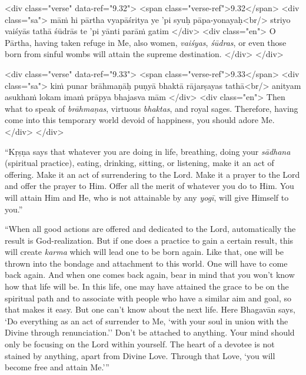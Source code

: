 \begin{html}
<div class="verse" data-ref="9.32">
  <span class="verse-ref">9.32</span>
  <div class="sa">
    māṁ hi pārtha vyapāśritya ye ’pi syuḥ pāpa-yonayaḥ<br/>
    striyo vaiśyās tathā śūdrās te ’pi yānti parāṁ gatim
  </div>
  <div class="en">
    O Pārtha, having taken refuge in Me, also women, \textit{vaiśyas}, \textit{śūdras}, or even those born from sinful wombs will attain the supreme destination.
  </div>
</div>
\end{html}



\begin{html}
<div class="verse" data-ref="9.33">
  <span class="verse-ref">9.33</span>
  <div class="sa">
    kiṁ punar brāhmaṇāḥ puṇyā bhaktā rājarṣayas tathā<br/>
    anityam asukhaṁ lokam imaṁ prāpya bhajasva mām
  </div>
  <div class="en">
    Then what to speak of \textit{brāhmaṇas}, virtuous \textit{bhaktas}, and royal sages. Therefore, having come into this temporary world devoid of happiness, you should adore Me.
  </div>
</div>
\end{html}


\enquote{Kṛṣṇa says that whatever you are doing in life, breathing, doing your \textit{sādhana} (spiritual practice), eating, drinking, sitting, or listening, make it an act of offering. Make it an act of surrendering to the Lord. Make it a prayer to the Lord and offer the prayer to Him. Offer all the merit of whatever you do to Him. You will attain Him and He, who is not attainable by any \textit{yogī}, will give Himself to you.}

\enquote{When all good actions are offered and dedicated to the Lord, automatically the result is God-realization. But if one does a practice to gain a certain result, this will create \textit{karma} which will lead one to be born again. Like that, one will be thrown into the bondage and attachment to this world. One will have to come back again. And when one comes back again, bear in mind that you won’t know how that life will be. In this life, one may have attained the grace to be on the spiritual path and to associate with people who have a similar aim and goal, so that makes it easy. But one can’t know about the next life. Here Bhagavān says, \enquote{Do everything as an act of surrender to Me, ‘with your soul in union with the Divine through renunciation.’} Don’t be attached to anything. Your mind should only be focusing on the Lord within yourself. The heart of a devotee is not stained by anything, apart from Divine Love. Through that Love, \enquote{you will become free and attain Me.}}

